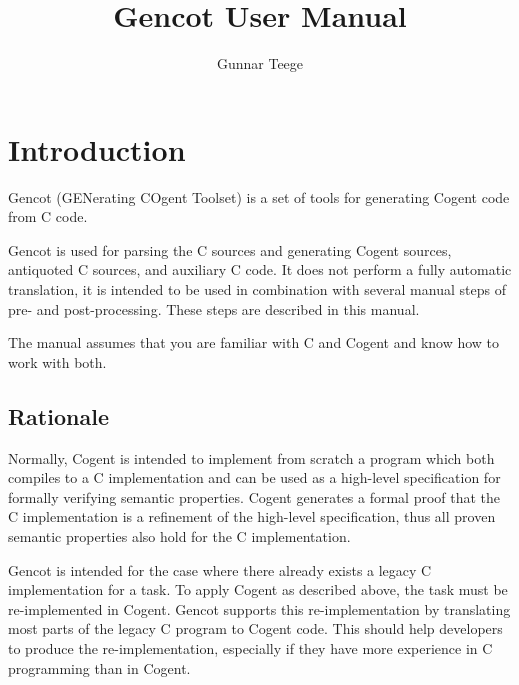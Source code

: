\documentclass[a4paper]{report}
\begin{document}
\title{Gencot User Manual}
\author{Gunnar Teege}

\maketitle

\chapter{Introduction}

Gencot (GENerating COgent Toolset) is a set of tools for generating Cogent code from C code. 

Gencot is used for parsing the C sources and generating Cogent sources, 
antiquoted C sources, and auxiliary C code. It does not perform a fully automatic translation, it is
intended to be used in combination with several manual steps of pre- and post-processing. These
steps are described in this manual.

The manual assumes that you are familiar with C and Cogent and know how to work with both.

\section{Rationale}
\label{intro-rationale}

Normally, Cogent is intended to implement from scratch a program which both compiles to a C implementation
and can be used as a high-level specification for formally verifying semantic properties.
Cogent generates a formal proof that the C implementation is a refinement of the high-level specification,
thus all proven semantic properties also hold for the C implementation.

Gencot is intended for the case where there already exists a legacy C implementation for a task. To apply
Cogent as described above, the task must be re-implemented in Cogent. Gencot supports this re-implementation 
by translating most parts of the legacy C program to Cogent code. This should help developers
to produce the re-implementation, especially if they have more experience in C programming than in Cogent.
\end{document}
